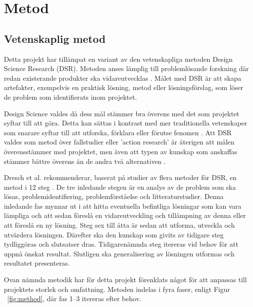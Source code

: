 \section{Metod} %
\label{sec:metod}
    
    \subsection{Vetenskaplig metod} %
    \label{sub:vetenskaplig_metod}
    	Detta projekt har tillämpat en variant av den vetenskapliga metoden Design Science Research (DSR). Metoden anses lämplig till problemlösande forskning där redan existerande produkter ska vidareutvecklas \cite{dsr}. Målet med DSR är att skapa artefakter, exempelvis en praktisk lösning, metod eller lösningsförslag, som löser de problem som identifierats inom projektet. \bigskip

        Design Science valdes då dess mål stämmer bra överens med det som projektet syftar till att göra. Detta kan sättas i kontrast med mer traditionella vetenskaper som snarare syftar till att utforska, förklara eller förutse fenomen \cite[s.~13]{dsr}. Att DSR valdes som metod över fallstudier eller 'action research' är återigen att målen överensstämmer med projektet, men även att typen av kunskap som anskaffas stämmer bättre överens än de andra två alternativen \cite[s.~95]{dsr}.\bigskip

    	Dresch et al. rekommenderar, baserat på studier av flera metoder för DSR, en metod i 12 steg \cite[s.~118--126]{dsr}. De tre inledande stegen är en analys av de problem som ska lösas, problemidentifiering, problemförståelse och litteraturstudier. Denna inledande fas mynnar ut i att hitta eventuella befintliga lösningar som kan vara lämpliga och att sedan föreslå en vidareutveckling och tillämpning av denna eller att föreslå en ny lösning. Steg sex till åtta är sedan att utforma, utveckla och utvärdera lösningen. Därefter ska den kunskap som givits av tidigare steg tydliggöras och slutsatser dras. Tidigarenämnda steg itereras vid behov för att uppnå önskat resultat. Slutligen ska generalisering av lösningen utformas och resultatet presenteras. \bigskip

    	Ovan nämnda metodik har för detta projekt förenklats något för att anpassas till projektets storlek och omfattning. Metoden indelas i fyra faser, enligt Figur ~\ref{fig:method}, där fas 1--3 itereras efter behov.

